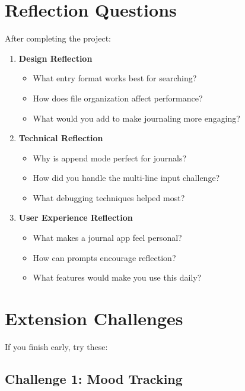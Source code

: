 \documentclass[
  letterpaper,
  DIV=11,
  numbers=noendperiod,
  oneside]{scrreprt}
\providecommand{\tightlist}{%
  \setlength{\itemsep}{0pt}\setlength{\parskip}{0pt}}\usepackage{longtable,booktabs,array}
\begin{document}
\section{Reflection Questions}\label{reflection-questions-6}

After completing the project:

\begin{enumerate}
\def\labelenumi{\arabic{enumi}.}
\tightlist
\item
  \textbf{Design Reflection}

  \begin{itemize}
  \tightlist
  \item
    What entry format works best for searching?
  \item
    How does file organization affect performance?
  \item
    What would you add to make journaling more engaging?
  \end{itemize}
\item
  \textbf{Technical Reflection}

  \begin{itemize}
  \tightlist
  \item
    Why is append mode perfect for journals?
  \item
    How did you handle the multi-line input challenge?
  \item
    What debugging techniques helped most?
  \end{itemize}
\item
  \textbf{User Experience Reflection}

  \begin{itemize}
  \tightlist
  \item
    What makes a journal app feel personal?
  \item
    How can prompts encourage reflection?
  \item
    What features would make you use this daily?
  \end{itemize}
\end{enumerate}

\section{Extension Challenges}\label{extension-challenges-6}

If you finish early, try these:

\subsection{Challenge 1: Mood Tracking}\label{challenge-1-mood-tracking}
\end{document}
